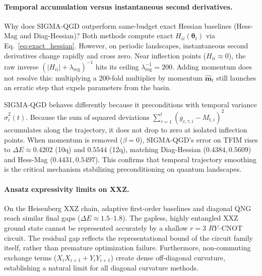 \documentclass[11pt,a4paper]{article}
\begin{document}
\paragraph{Temporal accumulation versus instantaneous second derivatives.}
Why does SIGMA-QGD outperform same-budget exact Hessian baselines (Hess-Mag and Diag-Hessian)? Both methods compute exact $H_{ii}(\boldsymbol{\theta}_t)$ via Eq.~\eqref{eq:exact_hessian}. However, on periodic landscapes, instantaneous second derivatives change rapidly and cross zero. Near inflection points ($H_{ii} \approx 0$), the raw inverse $(|H_{ii}| + \lambda_{\text{reg}})^{-1}$ hits its ceiling $\lambda_{\text{reg}}^{-1} = 200$. Adding momentum does not resolve this: multiplying a 200-fold multiplier by momentum $\hat{\mathbf{m}}_t$ still launches an erratic step that expels parameters from the basin.

SIGMA-QGD behaves differently because it preconditions with temporal variance $\hat{\sigma}_i^2(t)$. Because the sum of squared deviations $\sum_{\tau=1}^t (g_{c,\tau,i} - M_{t,i})^2$ accumulates along the trajectory, it does not drop to zero at isolated inflection points. When momentum is removed ($\beta = 0$), SIGMA-QGD's error on TFIM rises to $\Delta E \approx 0.4202$ (10q) and $0.5544$ (12q), matching Diag-Hessian ($0.4384, 0.5609$) and Hess-Mag ($0.4431, 0.5497$). This confirms that temporal trajectory smoothing is the critical mechanism stabilizing preconditioning on quantum landscapes.

\paragraph{Ansatz expressivity limits on XXZ.}
On the Heisenberg XXZ chain, adaptive first-order baselines and diagonal QNG reach similar final gaps ($\Delta E \approx 1.5$--$1.8$). The gapless, highly entangled XXZ ground state cannot be represented accurately by a shallow $r=3$ $RY$--CNOT circuit. The residual gap reflects the representational bound of the circuit family itself, rather than premature optimization failure. Furthermore, non-commuting exchange terms ($X_i X_{i+1} + Y_i Y_{i+1}$) create dense off-diagonal curvature, establishing a natural limit for all diagonal curvature methods.
\end{document}
